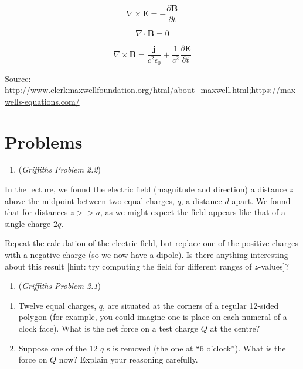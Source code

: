 \documentclass[
  letterpaper,
  DIV=11,
  numbers=noendperiod]{scrreprt}
\providecommand{\tightlist}{%
  \setlength{\itemsep}{0pt}\setlength{\parskip}{0pt}}\usepackage{longtable,booktabs,array}
\begin{document}
\begin{equation}
\nabla \times \mathbf{E} = - \frac{\partial \mathbf{B}}{\partial t} 
\end{equation}

\begin{equation}
\nabla \cdot \mathbf{B} = 0
\end{equation}

\begin{equation}
\nabla \times \mathbf{B} = \frac{\mathbf{j}}{c^2 \epsilon_0} + \frac{1}{c^2} \frac{\partial \mathbf{E}}{\partial t}
\end{equation}

Source:
\url{http://www.clerkmaxwellfoundation.org/html/about_maxwell.html};\url{https://maxwells-equations.com/}

\section{Problems}\label{problems}

\begin{enumerate}
\def\labelenumi{\arabic{enumi})}
\tightlist
\item
  (\emph{Griffiths Problem 2.2})
\end{enumerate}

In the lecture, we found the electric field (magnitude and direction) a
distance \(z\) above the midpoint between two equal charges, \(q\), a
distance \(d\) apart. We found that for distances \(z >> a\), as we
might expect the field appears like that of a single charge \(2q\).

Repeat the calculation of the electric field, but replace one of the
positive charges with a negative charge (so we now have a dipole). Is
there anything interesting about this result {[}hint: try computing the
field for different ranges of \(z\)-values{]}?

\begin{enumerate}
\def\labelenumi{\arabic{enumi})}
\setcounter{enumi}{1}
\tightlist
\item
  (\emph{Griffiths Problem 2.1})
\end{enumerate}

\begin{enumerate}
\def\labelenumi{(\alph{enumi})}
\item
  Twelve equal charges, \(q\), are situated at the corners of a regular
  12-sided polygon (for example, you could imagine one is place on each
  numeral of a clock face). What is the net force on a test charge \(Q\)
  at the centre?
\item
  Suppose one of the 12 \(q\) s is removed (the one at ``6 o'clock'').
  What is the force on \(Q\) now? Explain your reasoning carefully.
\end{enumerate}
\end{document}
